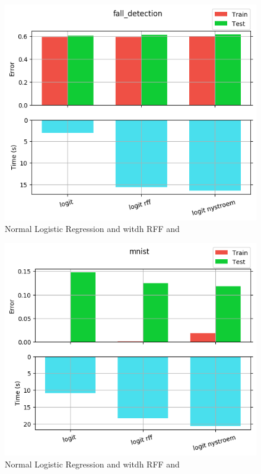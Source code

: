 \begin{figure}[th]
\centering
\includegraphics[scale=\imgscale]{Figures/2_1/fall_detection}
\decoRule
\caption[2.1 fall\tu detection]{Normal Logistic Regression and witdh RFF and \Nys}
\label{fig:2_1_fall_detection}
\end{figure}

\begin{figure}[th]
\centering
\includegraphics[scale=\imgscale]{Figures/2_1/mnist}
\decoRule
\caption[2.1 mnist]{Normal Logistic Regression and witdh RFF and \Nys}
\label{fig:2_1_mnist}
\end{figure}

